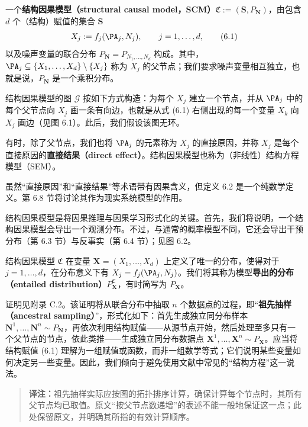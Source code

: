 \begin{definition}[结构因果模型]
一个\textbf{结构因果模型（structural causal model，SCM）}$\mathfrak C:=(\mathbf S,P_{\mathbf N})$，由包含 $d$ 个（结构）赋值的集合 $\mathbf S$
\begin{equation}
 X_j:=f_j(\PA_j,N_j),\qquad j=1,\ldots,d,
 \tag{6.1}
\end{equation}
以及噪声变量的联合分布 $P_{\mathbf N}=P_{N_1,\ldots,N_d}$ 构成。其中，$\PA_j\subseteq\{X_1,\ldots,X_d\}\setminus\{X_j\}$ 称为 $X_j$ 的父节点；我们要求噪声变量相互独立，也就是说，$P_{\mathbf N}$ 是一个乘积分布。

结构因果模型的图 $\mathcal G$ 按如下方式构造：为每个 $X_j$ 建立一个节点，并从 $\PA_j$ 中的每个父节点向 $X_j$ 画一条有向边，也就是从式 (6.1) 右侧出现的每一个变量 $X_k$ 向 $X_j$ 画边（见图 6.1）。此后，我们假设该图无环。

有时，除了父节点，我们也将 $\PA_j$ 的元素称为 $X_j$ 的直接原因，并称 $X_j$ 是每个直接原因的\textbf{直接结果（direct effect）}。结构因果模型也称为（非线性）结构方程模型（SEM）。
\end{definition}



虽然“直接原因”和“直接结果”等术语带有因果含义，但定义 6.2 是一个纯数学定义。第 6.8 节将讨论其作为现实系统模型的作用。

结构因果模型是将因果推理与因果学习形式化的关键。首先，我们将说明，一个结构因果模型会导出一个观测分布。不过，与通常的概率模型不同，它还会导出干预分布（第 6.3 节）与反事实（第 6.4 节）；见图 6.2。

\begin{proposition}[模型导出的分布]
结构因果模型 $\mathfrak C$ 在变量 $\mathbf X=(X_1,\ldots,X_d)$ 上定义了唯一的分布，使得对于 $j=1,\ldots,d$，在分布意义下有 $X_j=f_j(\PA_j,N_j)$。我们将其称为模型\textbf{导出的分布（entailed distribution）}$P_{\mathbf X}^{\mathfrak C}$，有时简写为 $P_{\mathbf X}$。
\end{proposition}

证明见附录 C.2。该证明将从联合分布中抽取 $n$ 个数据点的过程，即“\textbf{祖先抽样（ancestral sampling）}”，形式化如下：首先生成独立同分布样本 $\mathbf N^1,\ldots,\mathbf N^n\sim P_{\mathbf N}$，再依次利用结构赋值——从源节点开始，然后处理至多只有一个父节点的节点，依此类推——生成独立同分布数据点 $\mathbf X^1,\ldots,\mathbf X^n\sim P_{\mathbf X}$。应当将结构赋值 (6.1) 理解为一组赋值或函数，而非一组数学等式；它们说明某些变量如何决定另一些变量。因此，我们倾向于避免使用文献中常见的“结构方程”这一说法。
\begin{quote}\small
\textbf{译注：}祖先抽样实际应按图的拓扑排序计算，确保计算每个节点时，其所有父节点均已取值。原文“按父节点数递增”的表述不能一般地保证这一点；此处保留原文，并明确其所指的有效计算顺序。
\end{quote}

